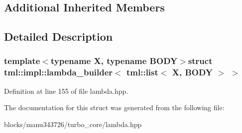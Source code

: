 \subsection*{Additional Inherited Members}


\subsection{Detailed Description}
\subsubsection*{template$<$typename X, typename B\+O\+D\+Y$>$struct tml\+::impl\+::lambda\+\_\+builder$<$ tml\+::list$<$ X, B\+O\+D\+Y $>$ $>$}



Definition at line 155 of file lambda.\+hpp.



The documentation for this struct was generated from the following file\+:\begin{DoxyCompactItemize}
\item 
blocks/manu343726/turbo\+\_\+core/lambda.\+hpp\end{DoxyCompactItemize}
